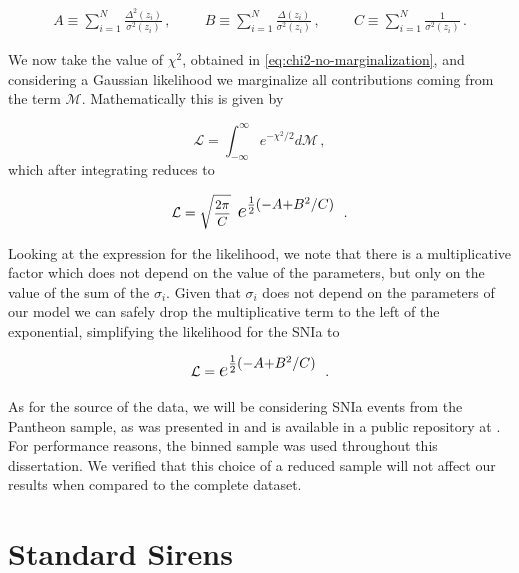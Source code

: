 \begin{gather}
    A \equiv \sum_{i = 1}^N \frac{\Delta^2(z_i)}{\sigma^2(z_i)} \,, \hspace{1cm}
    B \equiv \sum_{i = 1}^N \frac{\Delta(z_i)}{\sigma^2(z_i)} \,, \hspace{1cm}
    C \equiv \sum_{i = 1}^N \frac{1}{\sigma^2(z_i)} \,.
\end{gather}

We now take the value of $\chi^2$, obtained in \cref{eq:chi2-no-marginalization}, and considering a Gaussian likelihood we marginalize all contributions coming from the term $\mathcal{M}$. Mathematically this is given by

\begin{equation}
    \mathcal{L} = \int_{-\infty}^{\infty} e^{-\chi^2/2} d\mathcal{M} \,,
\end{equation}
which after integrating reduces to

\begin{equation}
    \mathcal{L} = \text{\small $\sqrt{\frac{2 \pi}{C}}$ } \, \text{\Large $e^{\frac{1}{2} (-A + B^2/C)}$ } \,.
\end{equation}

Looking at the expression for the likelihood, we note that there is a multiplicative factor which does not depend on the value of the parameters, but only on the value of the sum of the $\sigma_i$. Given that $\sigma_i$ does not depend on the parameters of our model we can safely drop the multiplicative term to the left of the exponential, simplifying the likelihood for the \gls{SNIa} to

\begin{equation}
    \label{eq:likelihoodsnia}
    \mathcal{L} = \text{\Large $e^{\frac{1}{2} (-A + B^2/C)}$ } \,.
\end{equation}

As for the source of the data, we will be considering \gls{SNIa} events from the Pantheon sample, as was presented in \cite{Pantheon} and is available in a public repository at \cite{Pantheon-repo}. For performance reasons, the binned sample was used throughout this dissertation. We verified that this choice of a reduced sample will not affect our results when compared to the complete dataset.


\section{Standard Sirens}
\label{sec:SS}

